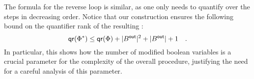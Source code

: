 The formula for the reverse loop is similar, as one only needs to quantify over
the steps in decreasing order. Notice that our construction ensures the following
bound on the quantifier rank of the resulting :
\begin{equation}
    \label{eq:iteration-smart-quantifier-rank}
    \qrank(\Phi^*) 
    \leq \qrank(\Phi) 
    + |B^{\mathsf{out}}|^2
    + |B^{\mathsf{out}}|
    + 1 \quad .
\end{equation}
In particular, this shows how the number of modified boolean variables
is a crucial parameter for the complexity of the overall procedure,
justifying the need for a careful analysis of this parameter.
